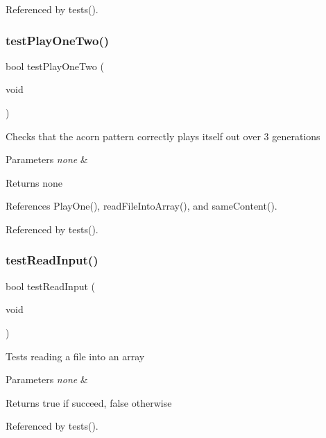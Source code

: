 Referenced by tests().

\mbox{\label{tests_8h_aaa5af386e80343cee306b7ae5709fc58}} 
\subsubsection{test\+Play\+One\+Two()}
{\footnotesize\ttfamily bool test\+Play\+One\+Two (\begin{DoxyParamCaption}\item[{void}]{ }\end{DoxyParamCaption})}

Checks that the acorn pattern correctly plays itself out over 3 generations 
\begin{DoxyParams}{Parameters}
{\em none} & \\
\hline
\end{DoxyParams}
\begin{DoxyReturn}{Returns}
none 
\end{DoxyReturn}


References Play\+One(), read\+File\+Into\+Array(), and same\+Content().



Referenced by tests().

\mbox{\label{tests_8h_aa89f64db87aebe77bd891e2894595e4e}} 
\subsubsection{test\+Read\+Input()}
{\footnotesize\ttfamily bool test\+Read\+Input (\begin{DoxyParamCaption}\item[{void}]{ }\end{DoxyParamCaption})}

Tests reading a file into an array 
\begin{DoxyParams}{Parameters}
{\em none} & \\
\hline
\end{DoxyParams}
\begin{DoxyReturn}{Returns}
true if succeed, false otherwise 
\end{DoxyReturn}


Referenced by tests().

\mbox{\label{tests_8h_a5e6e6e78df62797046c9ea173550a68a}} 
